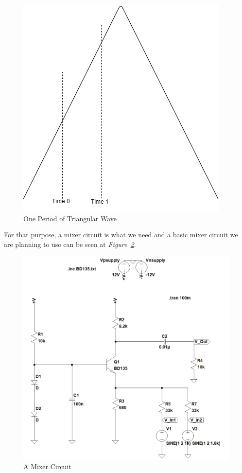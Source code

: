 \documentclass[paper]{IEEEtran}
\begin{document}
\begin{figure}[h!]
\setlength{\unitlength}{\textwidth}
\center 
\includegraphics[width=0.25\unitlength]{triangular.png}
\caption{\label{fig:trimix}One Period of Triangular Wave }
\end{figure}	

	
	For that purpose, a mixer circuit is what we need and a basic mixer circuit we are planning to use can be seen at \textit{Figure~\ref{fig:mixer}}.
	
\begin{figure}[h!]
\setlength{\unitlength}{\textwidth}
\center 
\includegraphics[width=0.45\unitlength]{mixer_final2.png}
\caption{\label{fig:mixer}A Mixer Circuit }
\end{figure}	
\end{document}
